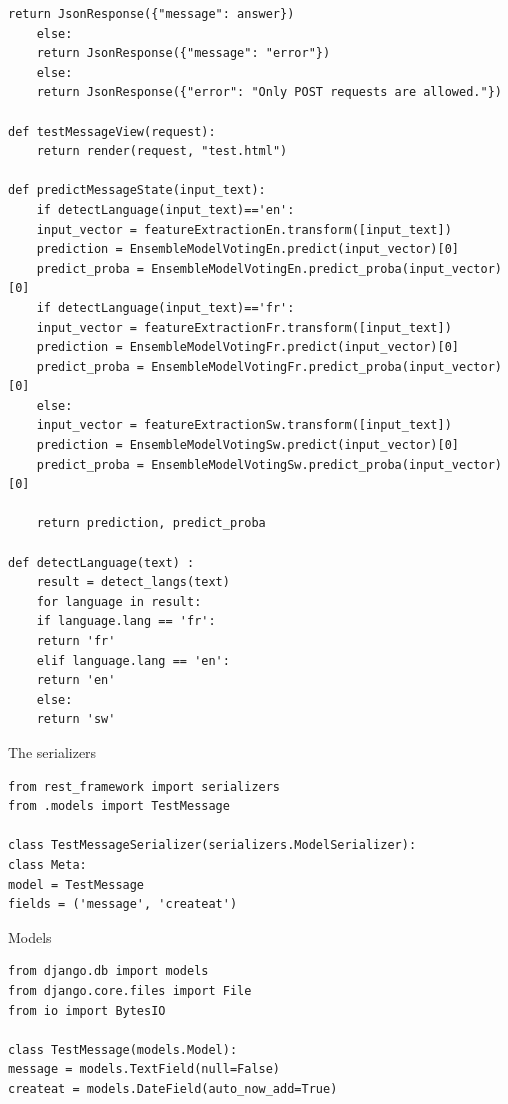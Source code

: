 \documentclass[12pt,a4paper, oneside]{book}
\begin{document}
\begin{lstlisting}[style=stylejupyter]
	return JsonResponse({"message": answer})
	else:
	return JsonResponse({"message": "error"})
	else:
	return JsonResponse({"error": "Only POST requests are allowed."})

def testMessageView(request):
	return render(request, "test.html")

def predictMessageState(input_text):
	if detectLanguage(input_text)=='en':
	input_vector = featureExtractionEn.transform([input_text])
	prediction = EnsembleModelVotingEn.predict(input_vector)[0]
	predict_proba = EnsembleModelVotingEn.predict_proba(input_vector)[0]
	if detectLanguage(input_text)=='fr':
	input_vector = featureExtractionFr.transform([input_text])
	prediction = EnsembleModelVotingFr.predict(input_vector)[0]
	predict_proba = EnsembleModelVotingFr.predict_proba(input_vector)[0]
	else:
	input_vector = featureExtractionSw.transform([input_text])
	prediction = EnsembleModelVotingSw.predict(input_vector)[0]
	predict_proba = EnsembleModelVotingSw.predict_proba(input_vector)[0] 
	
	return prediction, predict_proba

def detectLanguage(text) :
	result = detect_langs(text)
	for language in result:
	if language.lang == 'fr':
	return 'fr'
	elif language.lang == 'en':
	return 'en'
	else:
	return 'sw'
\end{lstlisting}
The serializers
\begin{lstlisting}[style=stylejupyter]
from rest_framework import serializers
from .models import TestMessage

class TestMessageSerializer(serializers.ModelSerializer):
class Meta:
model = TestMessage
fields = ('message', 'createat')  
\end{lstlisting}
Models
\begin{lstlisting}[style=stylejupyter] 
from django.db import models
from django.core.files import File
from io import BytesIO

class TestMessage(models.Model):
message = models.TextField(null=False)
createat = models.DateField(auto_now_add=True)

\end{lstlisting}
\backmatter
\appendix	
	
	
	
	
	
	
	
\end{document}
